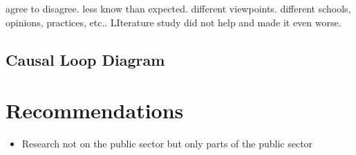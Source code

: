 agree to disagree. less know than expected. different viewpoints. different schools, opinions, practices, etc.. LIterature study did not help and made it even worse.

\subsection{Causal Loop Diagram}

\section{Recommendations}
\label{sec:reccomandations}

\begin{itemize}
	\item{Research not on the public sector but only parts of the public sector}
\end{itemize}